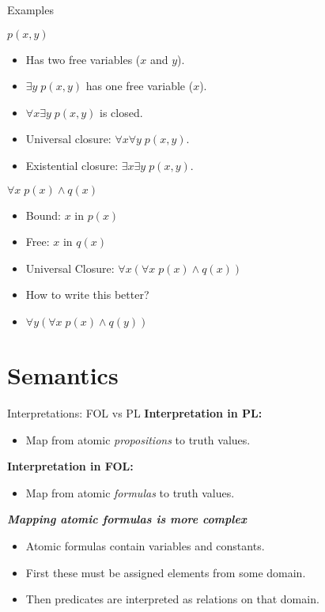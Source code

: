 \documentclass[style=sailor,size=12pt]{powerdot}
\begin{document}
\begin{wideslide}[bm=,toc=]{Examples}
\begin{ex}{7.13}
$p(x,y)$
\end{ex}
\vspace*{-2ex}
\begin{itemize}
\item<2-> Has two free variables ($x$ and $y$).
\item<3-> $\exists y\; p(x,y)$ has one free variable \pause[3] ($x$).
\item<5-> $\forall x \exists y \;p(x,y)$ is closed.
\item<6-> Universal closure: \pause[3] $\forall x \forall y \;p(x,y)$.
\item<8-> Existential closure: \pause[2] $\exists x \exists y \;p(x,y)$.
\end{itemize}
\pause
\begin{ex}{7.14}
$\forall x \; p(x) \land q(x)$
\end{ex}
\vspace*{-2ex}
\begin{itemize}
\item<11-> Bound: \pause[2] $x$ in $p(x)$
\item<13-> Free: \pause[2] $x$ in $q(x)$
\item<15-> Universal Closure: \pause[2] $\forall x(\forall x \; p(x) \land q(x))$
\item<17-> How to write this better?
\item<18-> $\forall y(\forall x \; p(x) \land q(y))$
\end{itemize}
\end{wideslide}

\section[slide=true]{Semantics}
\begin{slide}[bm=,toc=]{Interpretations: FOL vs PL}
{\bf Interpretation in PL:}
\begin{itemize}
\item Map from atomic \emph{propositions} to truth values.
\end{itemize}
\pause
{\bf Interpretation in FOL:} 
\begin{itemize}
\item Map from atomic \emph{formulas} to truth values.
\end{itemize}
\vspace{1ex}
\pause
{\bf \emph{Mapping atomic formulas is more complex}}
\begin{itemize}
\item Atomic formulas contain variables and constants.
\item First these must be assigned elements from some domain.
\item Then predicates are interpreted as relations on that domain. 
\end{itemize}
\end{slide}
\end{document}
